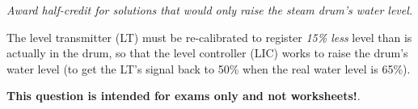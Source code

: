 
{\it Award half-credit for solutions that would only  raise the steam drum's water level.}

\vskip 10pt

The level transmitter (LT) must be re-calibrated to register {\it 15\% less} level than is actually in the drum, so that the level controller (LIC) works to raise the drum's water level (to get the LT's signal back to 50\% when the real water level is 65\%).







{\bf This question is intended for exams only and not worksheets!}.




